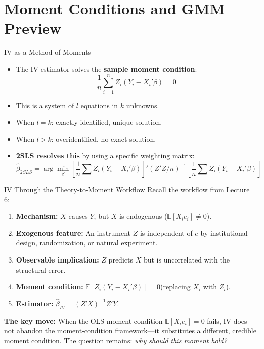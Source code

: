 \documentclass[aspectratio=169, handout]{beamer}
\numberwithin{equation}{section}
\begin{document}
\section{Moment Conditions and GMM Preview}

\begin{frame}{IV as a Method of Moments}
\begin{itemize}
\item The IV estimator solves the \textbf{sample moment condition}:
$$\frac{1}{n}\sum_{i=1}^n Z_i(Y_i - X_i'\beta) = 0$$
\item This is a system of $l$ equations in $k$ unknowns.
\item When $l=k$: exactly identified, unique solution.
\item When $l>k$: overidentified, no exact solution.
\item \textbf{2SLS resolves this} by using a specific weighting matrix:
$$\hat{\beta}_{2SLS} = \arg\min_\beta \left[\frac{1}{n}\sum Z_i(Y_i-X_i'\beta)\right]'(Z'Z/n)^{-1}\left[\frac{1}{n}\sum Z_i(Y_i-X_i'\beta)\right]$$
\end{itemize}
\end{frame}


\begin{frame}{IV Through the Theory-to-Moment Workflow}
Recall the workflow from Lecture 6:

\medskip
\begin{enumerate}
\item \textbf{Mechanism:} $X$ causes $Y$, but $X$ is endogenous ($\mathbb{E}[X_i e_i]\neq 0$).
\item \textbf{Exogenous feature:} An instrument $Z$ is independent of $e$ by institutional design, randomization, or natural experiment.
\item \textbf{Observable implication:} $Z$ predicts $X$ but is uncorrelated with the structural error.
\item \textbf{Moment condition:} $\mathbb{E}[Z_i(Y_i - X_i'\beta)]=0$\quad (replacing $X_i$ with $Z_i$).
\item \textbf{Estimator:} $\hat{\beta}_{IV}=(Z'X)^{-1}Z'Y$.
\end{enumerate}

\medskip\pause
\begin{tcolorbox}[colback=blue!5, colframe=blue!50]
\textbf{The key move:}  When the OLS moment condition $\mathbb{E}[X_i e_i]=0$ fails, IV does not abandon the moment-condition framework---it \alert{substitutes a different, credible moment condition}.  The question remains: \emph{why should this moment hold?}
\end{tcolorbox}
\end{frame}
\end{document}

